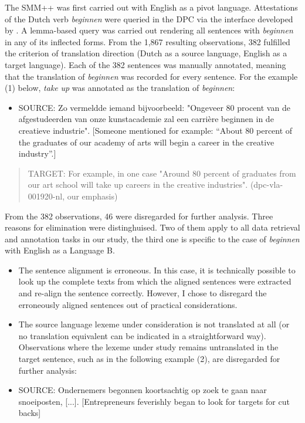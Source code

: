 The SMM++ was first carried out with English as a pivot language. Attestations of the Dutch verb \textit{beginnen} were queried in the DPC via the interface developed by \citet[62]{delaere_translations_2015}. A lemma-based query was carried out rendering all sentences with \textit{beginnen} in any of its inflected forms. From the 1,867 resulting observations, 382 fulfilled the criterion of translation direction (Dutch as a source language, English as a target language). Each of the 382 sentences was manually annotated, meaning that the translation of \textit{beginnen} was recorded for every sentence. For the example (1) below, \textit{take} \textit{up} was annotated as the translation of \textit{beginnen}:


\begin{itemize}
\item \begin{styleVoorbeeld}
SOURCE: Zo vermeldde iemand bijvoorbeeld: "Ongeveer 80 procent van de afgestudeerden van onze kunstacademie zal een carrière beginnen in de creatieve industrie". [Someone mentioned for example: “About 80 percent of the graduates of our academy of arts will begin a career in the creative industry”.]
\end{styleVoorbeeld}\end{itemize}
\begin{quote}
TARGET: For example, in one case "Around 80 percent of graduates from our art school will take up careers in the creative industries". (dpc-vla-001920-nl, our emphasis)
\end{quote}


From the 382 observations, 46 were disregarded for further analysis. Three reasons for elimination were distinghuised. Two of them apply to all data retrieval and annotation tasks in our study, the third one is specific to the case of \textit{beginnen} with English as a Language B.


\begin{itemize}
\item 
The sentence alignment is erroneous. In this case, it is technically possible to look up the complete texts from which the aligned sentences were extracted and re-align the sentence correctly. However, I chose to disregard the erroneously aligned sentences out of practical considerations.
\item 
The source language lexeme under consideration is not translated at all (or no translation equivalent can be indicated in a straightforward way). Observations where the lexeme under study remains untranslated in the target sentence, such as in the following example (2), are disregarded for further analysis:
\end{itemize}
\begin{itemize}
\item \begin{styleVoorbeeld}
SOURCE: Ondernemers begonnen koortsachtig op zoek te gaan naar snoeiposten, [...]. [Entrepreneurs feverishly began to look for targets for cut backs]
\end{styleVoorbeeld}\end{itemize}

